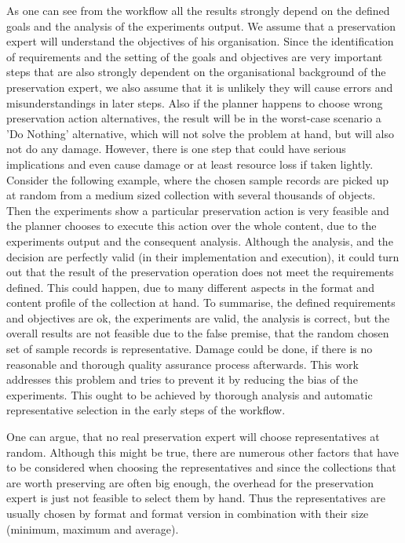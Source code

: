 As one can see from the workflow all the results strongly depend on the defined goals and the analysis of the experiments output. We assume that a preservation expert will understand the objectives of his organisation. Since the identification of requirements and the setting of the goals and objectives are very important steps that are also strongly dependent on the organisational background of the preservation expert, we also assume that it is unlikely they will cause errors and misunderstandings in later steps. Also if the planner happens to choose wrong preservation action alternatives, the result will be in the worst-case scenario a 'Do Nothing' alternative, which will not solve the problem at hand, but will also not do any damage.
However, there is one step that could have serious implications and even cause damage or at least resource loss if taken lightly. Consider the following example, where the chosen sample records are picked up at random from a medium sized collection with several thousands of objects. Then the experiments show a particular preservation action is very feasible and the planner chooses to execute this action over the whole content, due to the experiments output and the consequent analysis. Although the analysis, and the decision are perfectly valid (in their implementation and execution), it could turn out that the result of the preservation operation does not meet the requirements defined. This could happen, due to many different aspects in the format and content profile of the collection at hand. To summarise, the defined requirements and objectives are ok, the experiments are valid, the analysis is correct, but the overall results are not feasible due to the false premise, that the random chosen set of sample records is representative. Damage could be done, if there is no reasonable and thorough quality assurance process afterwards. This work addresses this problem and tries to prevent it by reducing the bias of the experiments. This ought to be achieved by thorough analysis and automatic representative selection in the early steps of the workflow.

One can argue, that no real preservation expert will choose representatives at random. Although this might be true, there are numerous other factors that have to be considered when choosing the representatives and since the collections that are worth preserving are often big enough, the overhead for the preservation expert is just not feasible to select them by hand. Thus the representatives are usually chosen by format and format version in combination with their size (minimum, maximum and average).

